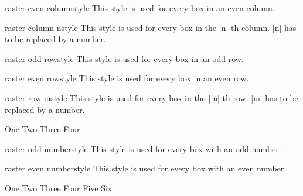 \begin{docTcbKey}[][doc new=2014-11-10]{raster even column}{}{style}
This style is used for every box in an even column.
\end{docTcbKey}


\begin{docTcbKey}[][doc new=2014-11-10]{raster column n}{}{style}
This style is used for every box in the |n|-th column.
|n| has to be replaced by a number.
\end{docTcbKey}


\begin{docTcbKey}[][doc new=2014-11-10]{raster odd row}{}{style}
This style is used for every box in an odd row.
\end{docTcbKey}

\begin{docTcbKey}[][doc new=2014-11-10]{raster even row}{}{style}
This style is used for every box in an even row.
\end{docTcbKey}


\begin{docTcbKey}[][doc new=2014-11-10]{raster row m}{}{style}
This style is used for every box in the |m|-th row.
|m| has to be replaced by a number.
\begin{dispExample}
\begin{tcbitemize}[size=small,colframe=red!50!black,colback=red!10!white,
  raster row 2/.style={colframe=blue!50!black,colback=blue!10!white}]
  \tcbitem One
  \tcbitem Two
  \tcbitem Three
  \tcbitem Four
\end{tcbitemize}
\end{dispExample}
\end{docTcbKey}

\begin{docTcbKey}[][doc new=2014-11-10]{raster odd number}{}{style}
This style is used for every box with an odd number.
\end{docTcbKey}

\begin{docTcbKey}[][doc new=2014-11-10]{raster even number}{}{style}
This style is used for every box with an even number.
\begin{dispExample}
\begin{tcbitemize}[size=small,colframe=red!50!black,colback=red!10!white,
  raster columns=3,
  raster even number/.style={colframe=blue!50!black,colback=blue!10!white}]
  \tcbitem One
  \tcbitem Two
  \tcbitem Three
  \tcbitem Four
  \tcbitem Five
  \tcbitem Six
\end{tcbitemize}
\end{dispExample}
\end{docTcbKey}


